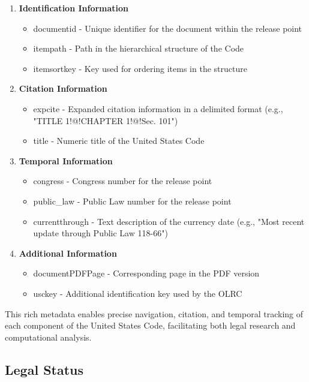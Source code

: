 \begin{enumerate}
    \item \textbf{Identification Information}
    \begin{itemize}
        \item documentid - Unique identifier for the document within the release point
        \item itempath - Path in the hierarchical structure of the Code
        \item itemsortkey - Key used for ordering items in the structure
    \end{itemize}
    
    \item \textbf{Citation Information}
    \begin{itemize}
        \item expcite - Expanded citation information in a delimited format (e.g., "TITLE 1!@!CHAPTER 1!@!Sec. 101")
        \item title - Numeric title of the United States Code
    \end{itemize}
    
    \item \textbf{Temporal Information}
    \begin{itemize}
        \item congress - Congress number for the release point
        \item public\_law - Public Law number for the release point
        \item currentthrough - Text description of the currency date (e.g., "Most recent update through Public Law 118-66")
    \end{itemize}
    
    \item \textbf{Additional Information}
    \begin{itemize}
        \item documentPDFPage - Corresponding page in the PDF version
        \item usckey - Additional identification key used by the OLRC
    \end{itemize}
\end{enumerate}

This rich metadata enables precise navigation, citation, and temporal tracking of each component of the United States Code, facilitating both legal research and computational analysis.

\subsection{Legal Status}

